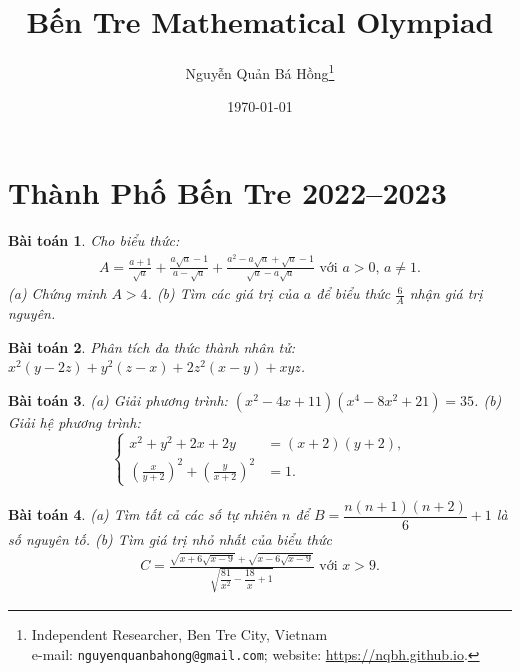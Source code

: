 \documentclass{article}
\title{Bến Tre Mathematical Olympiad}
\author{Nguyễn Quản Bá Hồng\footnote{Independent Researcher, Ben Tre City, Vietnam\\e-mail: \texttt{nguyenquanbahong@gmail.com}; website: \url{https://nqbh.github.io}.}}
\date{\today}
\newtheorem{baitoan}{Bài toán}
\begin{document}
\maketitle
\begin{abstract}
	
\end{abstract}
\tableofcontents


\section{Thành Phố Bến Tre 2022--2023}

\begin{baitoan}
	Cho biểu thức:
	\begin{align*}
		A = \frac{a + 1}{\sqrt{a}} + \frac{a\sqrt{a}  -1}{a - \sqrt{a}} + \frac{a^2 - a\sqrt{a} + \sqrt{a} - 1}{\sqrt{a} - a\sqrt{a}}\mbox{ với } a > 0,\,a\ne1.
	\end{align*}
	(a) Chứng minh $A > 4$. (b) Tìm các giá trị của $a$ để biểu thức $\frac{6}{A}$ nhận giá trị nguyên.
\end{baitoan}

\begin{baitoan}
	Phân tích đa thức thành nhân tử: $x^2(y - 2z) + y^2(z - x) + 2z^2(x - y) + xyz$.
\end{baitoan}

\begin{baitoan}
	(a) Giải phương trình: $(x^2 - 4x + 11)(x^4 - 8x^2 + 21) = 35$. (b) Giải hệ phương trình:
	\begin{equation*}
		\left\{\begin{split}
			x^2 + y^2 + 2x + 2y &= (x + 2)(y + 2),\\
			\left(\frac{x}{y + 2}\right)^2 + \left(\frac{y}{x + 2}\right)^2 &= 1.
		\end{split}\right.
	\end{equation*}
\end{baitoan}

\begin{baitoan}
	(a) Tìm tất cả các số tự nhiên $n$ để $B = \dfrac{n(n + 1)(n + 2)}{6} + 1$ là số nguyên tố. (b) Tìm giá trị nhỏ nhất của biểu thức
	\begin{align*}
		C = \frac{\sqrt{x + 6\sqrt{x - 9}} + \sqrt{x - 6\sqrt{x - 9}}}{\sqrt{\dfrac{81}{x^2} - \dfrac{18}{x} + 1}}\mbox{ với } x > 9.
	\end{align*}
\end{baitoan}
\end{document}
